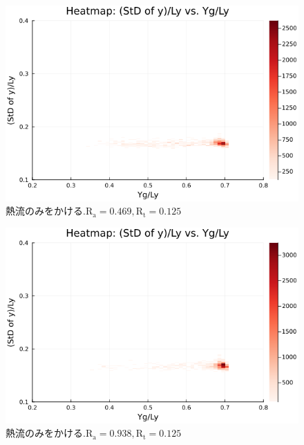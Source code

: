 \begin{figure}[H]
  \centering
  \includegraphics[scale=0.6]{image/g0_heat/2024-01-15T14:07:34.918_mapg0_chiinf_Ay50_rho0.4_T0.43_dT0.04_Rd0.0_Rt0.125_Ra0.4693845_g0_run4.0e7.png}
  \caption{$熱流のみをかける. \text{R}_\text{a}=0.469,\text{R}_\text{t}=0.125$}
  \label{}
\end{figure}

\begin{figure}[H]
  \centering
  \includegraphics[scale=0.6]{image/g0_heat/2024-01-15T14:07:34.988_mapg0_chiinf_Ay50_rho0.4_T0.43_dT0.04_Rd0.0_Rt0.125_Ra0.938769_g0_run4.0e7.png}
  \caption{$熱流のみをかける. \text{R}_\text{a}=0.938,\text{R}_\text{t}=0.125$}
  \label{}
\end{figure}

